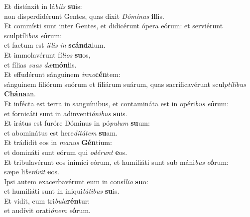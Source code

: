 \oddverse Et distínxit in lá\textit{bi}\textit{is} \textbf{su}is:~\*\\
\oddverse non disperdidérunt Gentes, quas dixit \textit{Dó}\textit{mi}\textit{nus} \textbf{il}lis.\\
\evenverse Et commísti sunt inter Gentes, et didicérunt ópera eórum: et serviérunt sculptíli\textit{bus} \textit{e}\textbf{ó}rum:~\*\\
\evenverse et factum est \textit{il}\textit{lis} \textit{in} \textbf{scán}\textbf{da}lum.\\
\oddverse Et immolavérunt fí\textit{li}\textit{os} \textbf{su}os,~\*\\
\oddverse et fílias \textit{su}\textit{as} \textit{dæ}\textbf{mó}\textbf{ni}is.\\
\evenverse Et effudérunt sánguinem \textit{in}\textit{no}\textbf{cén}tem:~\*\\
\evenverse sánguinem filiórum suórum et filiárum suárum, quas sacrificavérunt scul\textit{ptí}\textit{li}\textit{bus} \textbf{Chá}\textbf{na}an.\\
\oddverse Et infécta est terra in sanguínibus, et contamináta est in opéri\textit{bus} \textit{e}\textbf{ó}rum:~\*\\
\oddverse et fornicáti sunt in adinventi\textit{ó}\textit{ni}\textit{bus} \textbf{su}is.\\
\evenverse Et irátus est furóre Dóminus in pó\textit{pu}\textit{lum} \textbf{su}um:~\*\\
\evenverse et abominátus est here\textit{di}\textit{tá}\textit{tem} \textbf{su}am.\\
\oddverse Et trádidit eos in \textit{ma}\textit{nus} \textbf{Gén}tium:~\*\\
\oddverse et domináti sunt eórum qui \textit{o}\textit{dé}\textit{runt} \textbf{e}os.\\
\evenverse Et tribulavérunt eos inimíci eórum, et humiliáti sunt sub máni\textit{bus} \textit{e}\textbf{ó}rum:~\*\\
\evenverse sæpe li\textit{be}\textit{rá}\textit{vit} \textbf{e}os.\\
\oddverse Ipsi autem exacerbavérunt eum in consí\textit{li}\textit{o} \textbf{su}o:~\*\\
\oddverse et humiliáti sunt in iniqui\textit{tá}\textit{ti}\textit{bus} \textbf{su}is.\\
\evenverse Et vidit, cum tri\textit{bu}\textit{la}\textbf{rén}tur:~\*\\
\evenverse et audívit orati\textit{ó}\textit{nem} \textit{e}\textbf{ó}rum.\\
